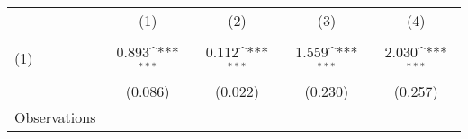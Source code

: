 {
\def\sym#1{\ifmmode^{#1}\else\(^{#1}\)\fi}
\begin{tabular}{l*{4}{c}}
\hline\hline
                    &\multicolumn{1}{c}{(1)}&\multicolumn{1}{c}{(2)}&\multicolumn{1}{c}{(3)}&\multicolumn{1}{c}{(4)}\\
                    &\multicolumn{1}{c}{} &\multicolumn{1}{c}{} &\multicolumn{1}{c}{} &\multicolumn{1}{c}{} \\
\hline
(1)                 &       0.893\sym{***}&       0.112\sym{***}&       1.559\sym{***}&       2.030\sym{***}\\
                    &     (0.086)         &     (0.022)         &     (0.230)         &     (0.257)         \\
\hline
Observations        &                     &                     &                     &                     \\
\hline\hline
\end{tabular}
}
